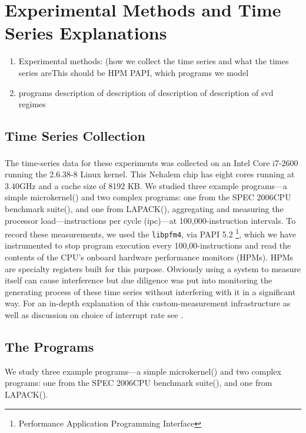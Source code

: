 \section{Experimental Methods and Time Series Explanations}

 \begin{enumerate}
 \item  Experimental methods: (how we collect the time series and what the times series areThis should be HPM PAPI, which programs we model
\item programs 
\subitem description of \col
\subitem description of \gcc
\subitem description of \svd 
\subitem description of svd regimes
 \end{enumerate}


\subsection{Time Series Collection}

The time-series data for these experiments was collected on an Intel Core\textsuperscript{\textregistered} i7-2600 running the 2.6.38-8 Linux
kernel.  This Nehalem chip has eight cores running at 3.40GHz and a cache size
of 8192 KB.  We studied three example programs---a simple microkernel(\col) and two complex programs: one from the
SPEC 2006CPU benchmark suite(\gcc), and one from LAPACK(\svd), aggregating and measuring the processor load---instructions per cycle (ipc)---at 100,000-instruction intervals.  To record these measurements,
we used the {\tt libpfm4}, via PAPI 5.2
\footnote{Performance Application Programming Interface}\cite{papi-website}, which we have instrumented to stop program execution every 100,00-instructions and read the contents of the CPU's onboard hardware performance monitors (HPMs). HPMs are specialty registers built for this purpose. Obviously using a system to measure itself can cause interference but due diligence was put into monitoring the generating process of these time series without interfering with it in a significant way. For an in-depth explanation of this custom-measurement infrastructure as well as discussion on choice of interrupt rate see 
\cite{zach-IDA10,mytkowicz09,todd-phd}.



\subsection{The Programs}
We study three example programs---a simple microkernel(\col) and two complex programs: one from the
SPEC 2006CPU benchmark suite(\gcc), and one from LAPACK(\svd).
